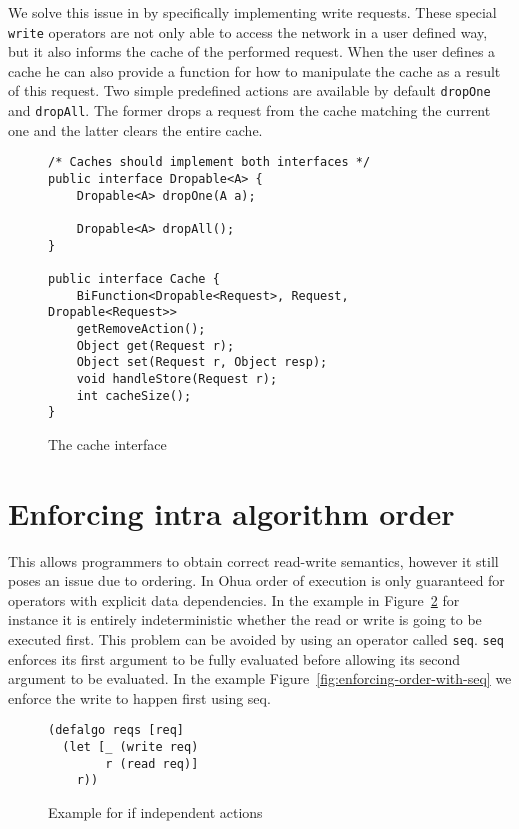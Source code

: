 We solve this issue in \yauhau{} by specifically implementing write requests.
These special \texttt{write} operators are not only able to access the network in a user defined way, but it also informs the cache of the performed request.
When the user defines a cache he can also provide a function for how to manipulate the cache as a result of this request.
Two simple predefined actions are available by default \texttt{dropOne} and \texttt{dropAll}.
The former drops a request from the cache matching the current one and the latter clears the entire cache.

\begin{figure}
\begin{verbatim}
/* Caches should implement both interfaces */
public interface Dropable<A> {
    Dropable<A> dropOne(A a);

    Dropable<A> dropAll();
}

public interface Cache {
    BiFunction<Dropable<Request>, Request, Dropable<Request>>
    getRemoveAction();
    Object get(Request r);
    Object set(Request r, Object resp);
    void handleStore(Request r);
    int cacheSize();
}
\end{verbatim}
\caption{The cache interface}
\label{fig:the-cache-interface}
\end{figure}

\section{Enforcing intra algorithm order}

This allows programmers to obtain correct read-write semantics, however it still poses an issue due to ordering.
In Ohua order of execution is only guaranteed for operators with explicit data dependencies.
In the example in Figure~\ref{fig:independent-actions-code} for instance it is entirely indeterministic whether the read or write is going to be executed first.
This problem can be avoided by using an operator called \texttt{seq}.
\texttt{seq} enforces its first argument to be fully evaluated before allowing its second argument to be evaluated.
In the example Figure~\ref{fig:enforcing-order-with-seq} we enforce the write to happen first using seq.

\begin{figure}
\begin{verbatim}
(defalgo reqs [req]
  (let [_ (write req)
        r (read req)]
    r))
\end{verbatim}
\caption{Example for if independent actions}
\label{fig:independent-actions-code}
\end{figure}

